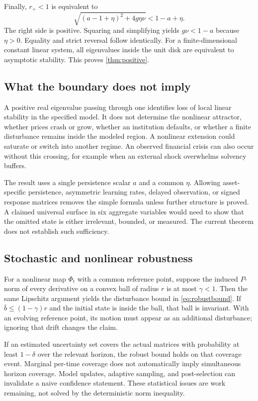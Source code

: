 \documentclass[10pt,twocolumn,letterpaper]{article}
\theoremstyle{definition}
\theoremstyle{remark}
\begin{document}
Finally, $r_+<1$ is equivalent to
\begin{equation}
 \sqrt{(a-1+\eta)^2+4g\eta\nu}<1-a+\eta.
\end{equation}
The right side is positive. Squaring and simplifying yields $g\nu<1-a$ because $\eta>0$. Equality and strict reversal follow identically. For a finite-dimensional constant linear system, all eigenvalues inside the unit disk are equivalent to asymptotic stability. This proves \cref{thm:positive}.

\subsection{What the boundary does not imply}
A positive real eigenvalue passing through one identifies loss of local linear stability in the specified model. It does not determine the nonlinear attractor, whether prices crash or grow, whether an institution defaults, or whether a finite disturbance remains inside the modeled region. A nonlinear extension could saturate or switch into another regime. An observed financial crisis can also occur without this crossing, for example when an external shock overwhelms solvency buffers.

The result uses a single persistence scalar $a$ and a common $\eta$. Allowing asset-specific persistence, asymmetric learning rates, delayed observation, or signed response matrices removes the simple formula unless further structure is proved. A claimed universal surface in six aggregate variables would need to show that the omitted state is either irrelevant, bounded, or measured. The current theorem does not establish such sufficiency.

\subsection{Stochastic and nonlinear robustness}
For a nonlinear map $\Phi_t$ with a common reference point, suppose the induced $P$-norm of every derivative on a convex ball of radius $r$ is at most $\gamma<1$. Then the same Lipschitz argument yields the disturbance bound in \cref{eq:robustbound}. If $\bar b\leq(1-\gamma)r$ and the initial state is inside the ball, that ball is invariant. With an evolving reference point, its motion must appear as an additional disturbance; ignoring that drift changes the claim.

If an estimated uncertainty set covers the actual matrices with probability at least $1-\delta$ over the relevant horizon, the robust bound holds on that coverage event. Marginal per-time coverage does not automatically imply simultaneous horizon coverage. Model updates, adaptive sampling, and post-selection can invalidate a naive confidence statement. These statistical issues are work remaining, not solved by the deterministic norm inequality.
\end{document}
